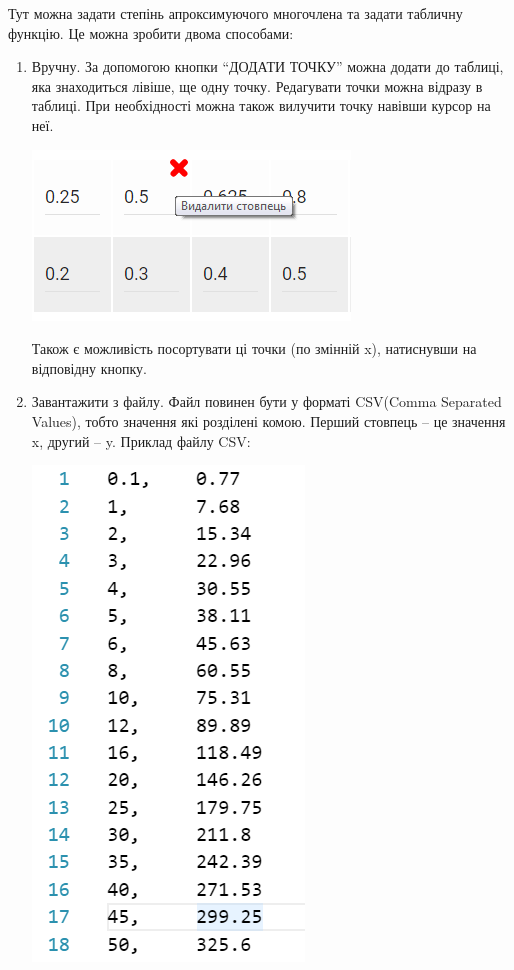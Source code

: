 \documentclass[ukrainian,14pt]{extarticle}
\begin{document}
Тут можна задати степінь апроксимуючого многочлена та задати табличну функцію. Це можна зробити двома способами:
\begin{enumerate}
    \item Вручну. За допомогою кнопки “ДОДАТИ ТОЧКУ” можна додати до таблиці, яка знаходиться лівіше, ще одну точку. Редагувати точки можна відразу в таблиці. При необхідності можна також вилучити точку навівши курсор на неї.

\includegraphics[scale=1]{program_screenshots/delete_point.png}

Також є можливість посортувати ці точки (по змінній x), натиснувши на відповідну кнопку.

    \item  Завантажити з файлу. Файл повинен бути у форматі CSV(Comma Separated Values), тобто значення які розділені комою. Перший стовпець – це значення x, другий – y. Приклад файлу CSV: 
\vspace{0.5cm}

\includegraphics[scale=1]{program_screenshots/points.png}


\end{enumerate}
\end{document}
